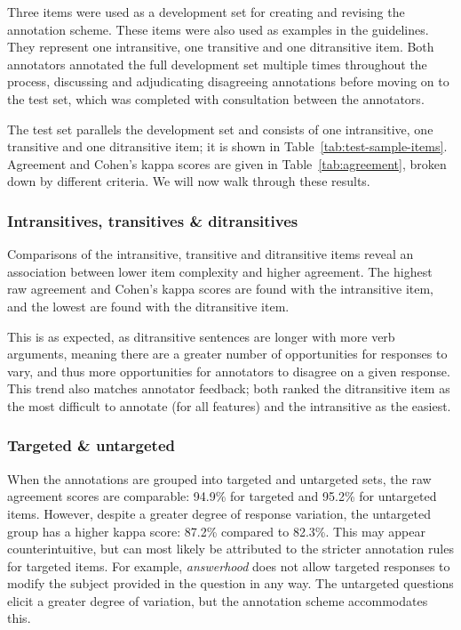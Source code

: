 \documentclass[11pt,a4paper]{article}
\begin{document}
Three items were used as a development set for creating and revising the annotation scheme. These items were also used as examples in the guidelines. They represent one intransitive, one transitive and one ditransitive item. Both annotators annotated the full development set multiple times throughout the process, discussing and adjudicating disagreeing annotations before moving on to the test set, which was completed with consultation between the annotators.

The test set parallels the development set and consists of one intransitive, one transitive and one ditransitive item; it is shown in Table~\ref{tab:test-sample-items}. Agreement and Cohen's kappa scores are given in Table~\ref{tab:agreement}, broken down by different criteria.  We will now walk through these results.

\subsubsection{Intransitives, transitives \& ditransitives} Comparisons of the intransitive, transitive and ditransitive items reveal an association between lower item complexity and higher agreement. The highest raw agreement and Cohen's kappa scores are found with the intransitive item, and the lowest are found with the ditransitive item. 

This is as expected, as ditransitive sentences are longer with more verb arguments, meaning there are a greater number of opportunities for responses to vary, and thus more opportunities for annotators to disagree on a given response. This trend also matches annotator feedback; both ranked the ditransitive item as the most difficult to annotate (for all features) and the intransitive as the easiest.

\subsubsection{Targeted \& untargeted} When the annotations are grouped into targeted and untargeted sets, the raw agreement scores are comparable: 94.9\% for targeted and 95.2\% for untargeted items. However, despite a greater degree of response variation, the untargeted group has a higher kappa score: 87.2\% compared to 82.3\%.  This may appear counterintuitive, but can most likely be attributed to the stricter annotation rules for targeted items. For example, \textit{answerhood} does not allow targeted responses to modify the subject provided in the question in any way. The untargeted questions elicit a greater degree of variation, but the annotation scheme accommodates this. 
\end{document}
